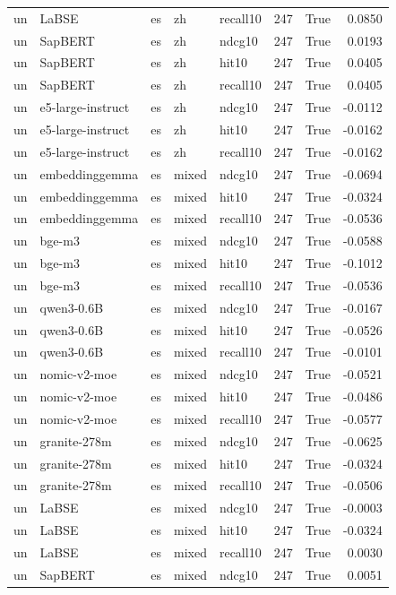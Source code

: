 \begin{tabular}{lllllrrr}
un & LaBSE & es & zh & recall10 & 247 & True & 0.0850 \\
un & SapBERT & es & zh & ndcg10 & 247 & True & 0.0193 \\
un & SapBERT & es & zh & hit10 & 247 & True & 0.0405 \\
un & SapBERT & es & zh & recall10 & 247 & True & 0.0405 \\
un & e5-large-instruct & es & zh & ndcg10 & 247 & True & -0.0112 \\
un & e5-large-instruct & es & zh & hit10 & 247 & True & -0.0162 \\
un & e5-large-instruct & es & zh & recall10 & 247 & True & -0.0162 \\
un & embeddinggemma & es & mixed & ndcg10 & 247 & True & -0.0694 \\
un & embeddinggemma & es & mixed & hit10 & 247 & True & -0.0324 \\
un & embeddinggemma & es & mixed & recall10 & 247 & True & -0.0536 \\
un & bge-m3 & es & mixed & ndcg10 & 247 & True & -0.0588 \\
un & bge-m3 & es & mixed & hit10 & 247 & True & -0.1012 \\
un & bge-m3 & es & mixed & recall10 & 247 & True & -0.0536 \\
un & qwen3-0.6B & es & mixed & ndcg10 & 247 & True & -0.0167 \\
un & qwen3-0.6B & es & mixed & hit10 & 247 & True & -0.0526 \\
un & qwen3-0.6B & es & mixed & recall10 & 247 & True & -0.0101 \\
un & nomic-v2-moe & es & mixed & ndcg10 & 247 & True & -0.0521 \\
un & nomic-v2-moe & es & mixed & hit10 & 247 & True & -0.0486 \\
un & nomic-v2-moe & es & mixed & recall10 & 247 & True & -0.0577 \\
un & granite-278m & es & mixed & ndcg10 & 247 & True & -0.0625 \\
un & granite-278m & es & mixed & hit10 & 247 & True & -0.0324 \\
un & granite-278m & es & mixed & recall10 & 247 & True & -0.0506 \\
un & LaBSE & es & mixed & ndcg10 & 247 & True & -0.0003 \\
un & LaBSE & es & mixed & hit10 & 247 & True & -0.0324 \\
un & LaBSE & es & mixed & recall10 & 247 & True & 0.0030 \\
un & SapBERT & es & mixed & ndcg10 & 247 & True & 0.0051 \\

\end{tabular}

